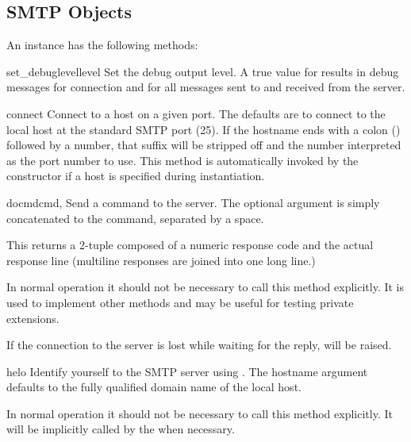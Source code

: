 \subsection{SMTP Objects \label{SMTP-objects}}

An  instance has the following methods:

\begin{methoddesc}{set_debuglevel}{level}
Set the debug output level.  A true value for  results in
debug messages for connection and for all messages sent to and
received from the server.
\end{methoddesc}

\begin{methoddesc}{connect}{}
Connect to a host on a given port.  The defaults are to connect to the
local host at the standard SMTP port (25).
If the hostname ends with a colon (\character{:}) followed by a
number, that suffix will be stripped off and the number interpreted as
the port number to use.
This method is automatically invoked by the constructor if a
host is specified during instantiation.
\end{methoddesc}

\begin{methoddesc}{docmd}{cmd, }
Send a command  to the server.  The optional argument
 is simply concatenated to the command, separated by a
space.

This returns a 2-tuple composed of a numeric response code and the
actual response line (multiline responses are joined into one long
line.)

In normal operation it should not be necessary to call this method
explicitly.  It is used to implement other methods and may be useful
for testing private extensions.

If the connection to the server is lost while waiting for the reply,
 will be raised.
\end{methoddesc}

\begin{methoddesc}{helo}{}
Identify yourself to the SMTP server using .  The hostname
argument defaults to the fully qualified domain name of the local
host.

In normal operation it should not be necessary to call this method
explicitly.  It will be implicitly called by the 
when necessary.
\end{methoddesc}

